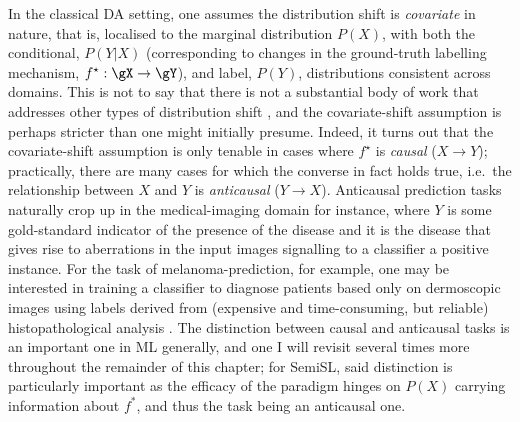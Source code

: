 %
In the classical \ac{DA} setting, one assumes the distribution shift is \emph{covariate}
\citep{david2010impossibility} in nature, that is, localised to the marginal distribution \(P(X)\),
with both the conditional, \(P(Y|X)\) (corresponding to changes in the ground-truth labelling
mechanism, \( f^\star: \gX \to \gY \)), and label, \(P(Y)\), distributions consistent across
domains.
%
This is not to say that there is not a substantial body of work that addresses other types of
distribution shift \citep{zhao2019learning}, and the covariate-shift assumption is perhaps stricter
than one might initially presume.
%
Indeed, it turns out that the covariate-shift assumption is only tenable in cases where \(f^\star\)
is \emph{causal} (\(X \to Y\)); practically, there are many cases for which the converse in fact
holds true, i.e.\ the relationship between \(X\) and \(Y\) is \emph{anticausal} (\(Y \to X\)).
%
Anticausal prediction tasks naturally crop up in the medical-imaging domain for instance, where
\(Y\) is some gold-standard indicator of the presence of the disease and it is the disease that
gives rise to aberrations in the input images signalling to a classifier a positive instance. 
%
For the task of melanoma-prediction, for example, one may be interested in training a classifier to
diagnose patients based only on dermoscopic images using labels derived from (expensive and
time-consuming, but reliable) histopathological analysis \citep{castro2020causality}.
%
The distinction between causal and anticausal tasks is an important one in \ac{ML} generally, and
one I will revisit several times more throughout the remainder of this chapter; for \ac{SemiSL},
said distinction is particularly important as the efficacy of the paradigm hinges on \( P(X) \)
carrying information about \(f^\ast\), and thus the task being an anticausal one.
%
%
